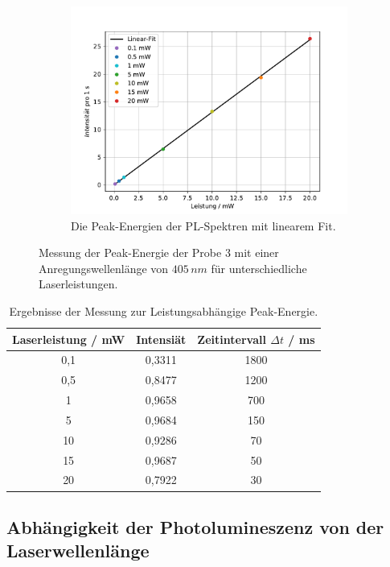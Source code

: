 \begin{figure}[H]
\begin{subfigure}[t]{0.45\textwidth}
	\includegraphics[width=\textwidth]{Plots/aufgabe1c3.pdf}
	\caption{Die Peak-Energien der PL-Spektren mit linearem Fit.}
	\label{abb:Leistungen_fit}
	\end{subfigure}
\caption{Messung der Peak-Energie der Probe 3 mit einer Anregungswellenl\"{a}nge von $405 \, nm$ f\"{u}r unterschiedliche Laserleistungen.}
\label{abb:auf1c}
\end{figure}

\begin{table}
	\centering
	\caption{Ergebnisse der Messung zur Leistungsabh\"{a}ngige Peak-Energie.}
\begin{tabular}{|ccc|}
	\hline
	{Laserleistung / mW} & {Intensi\"{a}t} & {Zeitintervall $\Delta t$ / ms} \\
	\hline
	0,1	&	0,3311	&	1800	\\
	0,5	&	0,8477	&	1200	\\
	1	&	0,9658	&	700	\\
	5	&	0,9684	&	150	\\
	10	&	0,9286	&	70	\\
	15	&	0,9687	&	50	\\
	20	&	0,7922	&	30	\\
	\hline
\end{tabular}
\end{table}



\subsection{Abhängigkeit der Photolumineszenz von der Laserwellenlänge}

